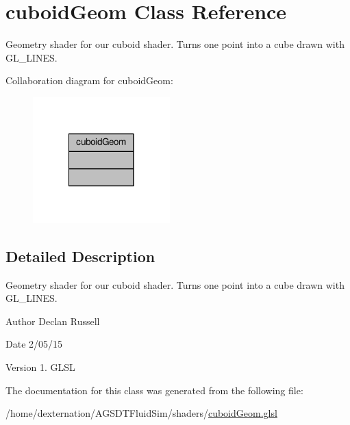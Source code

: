 \hypertarget{classcuboid_geom}{\section{cuboid\-Geom Class Reference}
\label{classcuboid_geom}
}


Geometry shader for our cuboid shader. Turns one point into a cube drawn with G\-L\-\_\-\-L\-I\-N\-E\-S.  




Collaboration diagram for cuboid\-Geom\-:\nopagebreak
\begin{figure}[H]
\begin{center}
\leavevmode
\includegraphics[width=150pt]{classcuboid_geom__coll__graph}
\end{center}
\end{figure}


\subsection{Detailed Description}
Geometry shader for our cuboid shader. Turns one point into a cube drawn with G\-L\-\_\-\-L\-I\-N\-E\-S. 

\begin{DoxyAuthor}{Author}
Declan Russell 
\end{DoxyAuthor}
\begin{DoxyDate}{Date}
2/05/15 
\end{DoxyDate}
\begin{DoxyVersion}{Version}
1.  G\-L\-S\-L 
\end{DoxyVersion}


The documentation for this class was generated from the following file\-:\begin{DoxyCompactItemize}
\item 
/home/dexternation/\-A\-G\-S\-D\-T\-Fluid\-Sim/shaders/\hyperlink{cuboid_geom_8glsl}{cuboid\-Geom.\-glsl}\end{DoxyCompactItemize}
